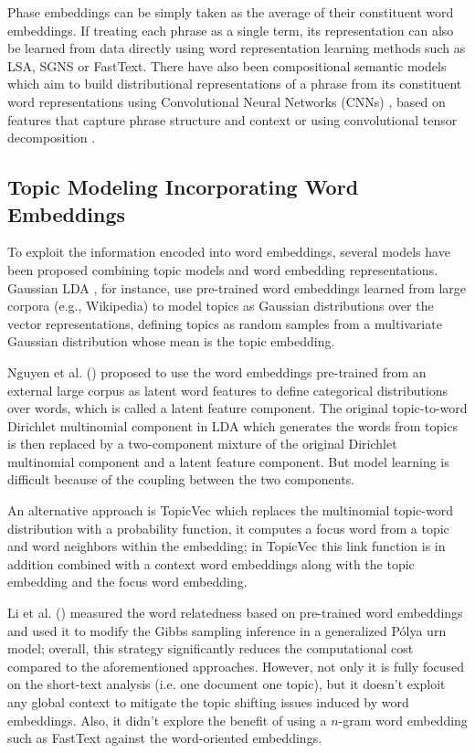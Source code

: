 \documentclass[letterpaper]{article}
\begin{document}
Phase embeddings can be simply taken as the average of their constituent word embeddings. If treating each phrase as a single term, its representation can also be learned from data directly using word representation learning methods such as LSA, SGNS or FastText. There have also been compositional semantic models which aim to build distributional representations of a phrase from its constituent
word representations using Convolutional Neural Networks (CNNs) \cite{le2014distributed}, based on features that capture phrase structure and context \cite{yu2015learning} or using convolutional tensor decomposition \cite{huang2016unsupervised}.

\subsection{Topic Modeling Incorporating Word Embeddings}

To exploit the information encoded into word embeddings, several models have been proposed combining topic models and word embedding representations. Gaussian LDA \cite{Das15}, for instance, use pre-trained word embeddings learned from large corpora (e.g., Wikipedia) to model topics as Gaussian distributions over the vector representations, defining topics as random samples from a multivariate Gaussian distribution whose mean is the topic embedding.

Nguyen et al. (\citeyear{nguyen2015improving}) proposed to use the word embeddings pre-trained from an external large corpus as latent word features to define categorical distributions over words, which is called a latent feature component. The original topic-to-word Dirichlet multinomial component in LDA which generates the words from topics is then replaced by a two-component mixture of the original Dirichlet multinomial component and a latent feature component. But model learning is difficult because of the coupling between the two components.

An alternative approach is TopicVec \cite{Li16} which replaces the multinomial topic-word distribution with a probability function, it computes a focus word from a topic and word neighbors within the embedding; in TopicVec this link function is in addition combined with a context word embeddings along with the topic embedding and the focus word embedding.

Li et al. (\citeyear{Li16SIGIR}) measured the word relatedness based on pre-trained word embeddings and used it to modify the Gibbs sampling inference in a generalized P\'{o}lya urn model; overall, this strategy significantly reduces the computational cost compared to the aforementioned approaches. However, not only it is fully focused on the short-text analysis (i.e. one document one topic), but it doesn't exploit any global context to mitigate the topic shifting issues induced by word embeddings. Also, it didn't explore the benefit of using a $n$-gram word embedding such as FastText against the word-oriented embeddings.
\end{document}
